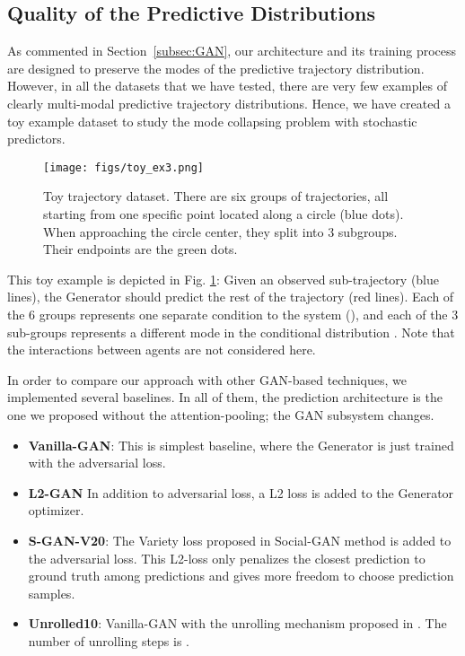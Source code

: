 \documentclass[10pt,twocolumn,letterpaper]{article}
\begin{document}
\subsection{Quality of the Predictive Distributions}
As commented in Section~\ref{subsec:GAN}, our architecture and its training process are designed to preserve the modes of the predictive trajectory distribution. However, in all the datasets that we have tested, there are very few examples of clearly multi-modal predictive trajectory distributions. Hence, we have created a toy example dataset to study the mode collapsing problem with stochastic predictors.

\begin{figure}[t!]
	\centering
	\texttt{[image: figs/toy\_ex3.png]}
	\caption{Toy trajectory dataset. There are six groups of trajectories, all starting from one specific point located along a circle (blue dots). When approaching the circle center, they split into 3 subgroups. Their endpoints are the green dots.}
	\vspace{-0.4cm}
	\label{toy_example_fig}	
\end{figure}

This toy example is depicted in Fig. \ref{toy_example_fig}: Given an observed sub-trajectory (blue lines), the Generator should predict the rest of the trajectory (red lines). Each of the 6 groups represents one separate condition to the system (), and each of the 3 sub-groups represents a different mode in the conditional distribution . Note that the interactions between agents are not considered here.


In order to compare our approach with other GAN-based techniques, we implemented several baselines. In all of them, the prediction architecture is the one we proposed without the attention-pooling; the GAN subsystem changes.

\begin{itemize}[leftmargin=*]
	\item \textbf{Vanilla-GAN}: This is simplest baseline, where the Generator is just trained with the adversarial loss.
	
	\item \textbf{L2-GAN} In addition to adversarial loss, a L2 loss is added to the Generator optimizer.
	
	\item \textbf{S-GAN-V20}: The Variety loss proposed in Social-GAN method \cite{SocialGAN2018} is added to the adversarial loss. This L2-loss only penalizes the closest prediction to ground truth among  predictions and gives more freedom to choose prediction samples.

	\item \textbf{Unrolled10}: Vanilla-GAN with the unrolling mechanism proposed in \cite{UnrolledGA2017}. The number of unrolling steps is .
	
	
\end{itemize}
\end{document}
